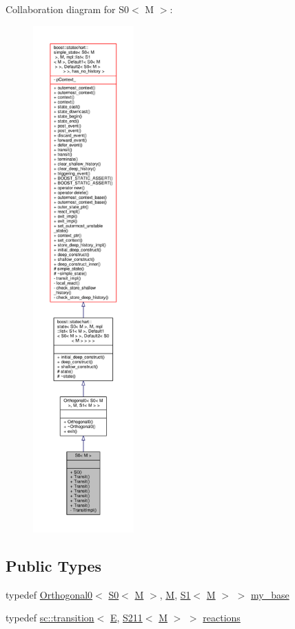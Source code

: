 Collaboration diagram for S0$<$ M $>$\+:
\nopagebreak
\begin{figure}[H]
\begin{center}
\leavevmode
\includegraphics[height=550pt]{struct_s0__coll__graph}
\end{center}
\end{figure}
\subsection*{Public Types}
\begin{DoxyCompactItemize}
\item 
typedef \mbox{\hyperlink{struct_orthogonal0}{Orthogonal0}}$<$ \mbox{\hyperlink{struct_s0}{S0}}$<$ \mbox{\hyperlink{struct_m}{M}} $>$, \mbox{\hyperlink{struct_m}{M}}, \mbox{\hyperlink{struct_s1}{S1}}$<$ \mbox{\hyperlink{struct_m}{M}} $>$ $>$ \mbox{\hyperlink{struct_s0_ab6b77c5f26dece1481b89ddb3603750a}{my\+\_\+base}}
\item 
typedef \mbox{\hyperlink{classboost_1_1statechart_1_1transition}{sc\+::transition}}$<$ \mbox{\hyperlink{struct_e}{E}}, \mbox{\hyperlink{struct_s211}{S211}}$<$ \mbox{\hyperlink{struct_m}{M}} $>$ $>$ \mbox{\hyperlink{struct_s0_a8dda440c194537ffcbfda3e92279905b}{reactions}}
\end{DoxyCompactItemize}
